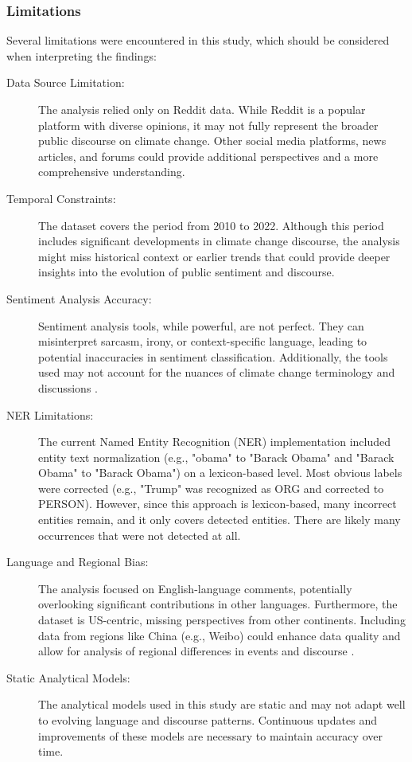 \subsubsection{Limitations}
Several limitations were encountered in this study, which should be considered when interpreting the findings:
\begin{description}
    \item[Data Source Limitation:] The analysis relied only on Reddit data. While Reddit is a popular platform with diverse opinions, it may not fully represent the broader public discourse on climate change. Other social media platforms, news articles, and forums could provide additional perspectives and a more comprehensive understanding.
    \item[Temporal Constraints:] The dataset covers the period from 2010 to 2022. Although this period includes significant developments in climate change discourse, the analysis might miss historical context or earlier trends that could provide deeper insights into the evolution of public sentiment and discourse.
    \item[Sentiment Analysis Accuracy:] Sentiment analysis tools, while powerful, are not perfect. They can misinterpret sarcasm, irony, or context-specific language, leading to potential inaccuracies in sentiment classification. Additionally, the tools used may not account for the nuances of climate change terminology and discussions \cite{liu2012}.
    \item[NER Limitations:] The current Named Entity Recognition (NER) implementation included entity text normalization (e.g., "obama" to "Barack Obama" and "Barack Obama" to "Barack Obama") on a lexicon-based level. Most obvious labels were corrected (e.g., "Trump" was recognized as ORG and corrected to PERSON). However, since this approach is lexicon-based, many incorrect entities remain, and it only covers detected entities. There are likely many occurrences that were not detected at all.
    \item[Language and Regional Bias:] The analysis focused on English-language comments, potentially overlooking significant contributions in other languages. Furthermore, the dataset is US-centric, missing perspectives from other continents. Including data from regions like China (e.g., Weibo) could enhance data quality and allow for analysis of regional differences in events and discourse \cite{8554131}.
    \item[Static Analytical Models:] The analytical models used in this study are static and may not adapt well to evolving language and discourse patterns. Continuous updates and improvements of these models are necessary to maintain accuracy over time.
\end{description}


